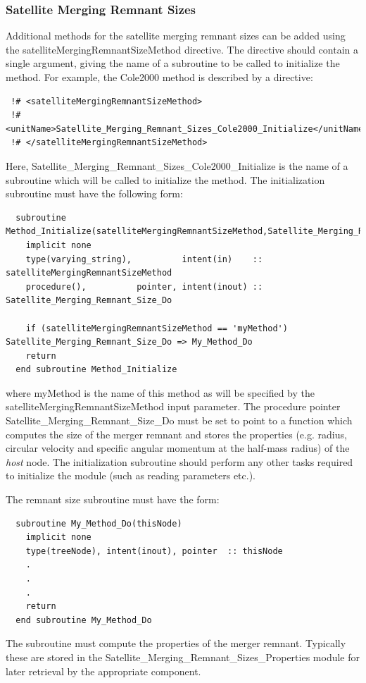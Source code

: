 \subsubsection{Satellite Merging Remnant Sizes}\label{sec:satelliteMergerMassMovementMethod}

Additional methods for the satellite merging remnant sizes can be added using the {\normalfont \ttfamily satelliteMergingRemnantSizeMethod} directive. The directive should contain a single argument, giving the name of a subroutine to be called to initialize the method. For example, the {\normalfont \ttfamily Cole2000} method is described by a directive:
\begin{verbatim}
 !# <satelliteMergingRemnantSizeMethod>
 !#  <unitName>Satellite_Merging_Remnant_Sizes_Cole2000_Initialize</unitName>
 !# </satelliteMergingRemnantSizeMethod>
\end{verbatim}
Here, {\normalfont \ttfamily Satellite\_Merging\_Remnant\_Sizes\_Cole2000\_Initialize} is the name of a subroutine which will be called to initialize the method. The initialization subroutine must have the following form:
\begin{verbatim}
  subroutine Method_Initialize(satelliteMergingRemnantSizeMethod,Satellite_Merging_Remnant_Size_Do)
    implicit none
    type(varying_string),          intent(in)    :: satelliteMergingRemnantSizeMethod
    procedure(),          pointer, intent(inout) :: Satellite_Merging_Remnant_Size_Do
    
    if (satelliteMergingRemnantSizeMethod == 'myMethod') Satellite_Merging_Remnant_Size_Do => My_Method_Do
    return
  end subroutine Method_Initialize
\end{verbatim}
where {\normalfont \ttfamily myMethod} is the name of this method as will be specified by the {\normalfont \ttfamily satelliteMergingRemnantSizeMethod} input parameter. The procedure pointer {\normalfont \ttfamily Satellite\_Merging\_Remnant\_Size\_Do} must be set to point to a function which computes the size of the merger remnant and stores the properties (e.g. radius, circular velocity and specific angular momentum at the half-mass radius) of the \emph{host} node. The initialization subroutine should perform any other tasks required to initialize the module (such as reading parameters etc.).

The remnant size subroutine must have the form:
\begin{verbatim}
  subroutine My_Method_Do(thisNode)
    implicit none
    type(treeNode), intent(inout), pointer  :: thisNode
    .
    .
    .
    return
  end subroutine My_Method_Do
\end{verbatim}
The subroutine must compute the properties of the merger remnant. Typically these are stored in the {\normalfont \ttfamily Satellite\_Merging\_Remnant\_Sizes\_Properties} module for later retrieval by the appropriate component.

